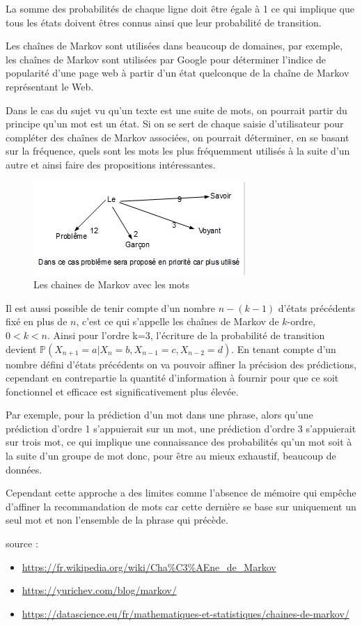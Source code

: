 \documentclass[final, 10pt]{report}
\begin{document}
La somme des probabilités de chaque ligne doit être égale à 1 ce qui implique que tous les états doivent êtres connus ainsi que leur probabilité de transition.

Les chaînes de Markov sont utilisées dans beaucoup de domaines, par exemple, les chaînes de Markov sont utilisées par Google pour déterminer l'indice de popularité d'une page web à partir d'un état quelconque de la chaîne de Markov représentant le Web.

Dans le cas du sujet vu qu'un texte est une suite de mots, on pourrait partir du principe qu'un mot est un état.
Si on se sert de chaque saisie d'utilisateur pour compléter des chaînes de Markov associées, on pourrait déterminer, en se basant sur la fréquence,  quels sont les mots les plus fréquemment utilisés à la suite d'un autre et ainsi faire des propositions intéressantes.
\begin{figure}[h]
    \centering
    \includegraphics[scale=1]{img/Mark.png}
    \caption{Les chaines de Markov avec les mots}
    \label{fig:chaine_markov_word}
\end{figure}

Il est aussi possible de tenir compte d'un nombre $n-(k-1)$ d'états précédents fixé en plus de $n$, c'est ce qui s'appelle les chaînes de Markov de $k$-ordre, $0<k<n$. Ainsi pour l'ordre k=3, l'écriture de la probabilité de transition devient $\mathbb{P}(X_{n+1}=a | X_{n}=b , X_{n-1}=c , X_{n-2}=d)$.
En tenant compte d'un nombre défini d'états précédents on va pouvoir affiner la précision des prédictions, cependant en contrepartie la quantité d'information à fournir pour que ce soit fonctionnel et efficace est significativement plus élevée.

Par exemple, pour la prédiction d'un mot dans une phrase, alors qu'une prédiction d'ordre 1 s'appuierait sur un mot, une prédiction d'ordre 3 s'appuierait sur trois mot, ce qui implique une connaissance des probabilités qu'un mot soit à la suite d'un groupe de mot donc, pour être au mieux exhaustif, beaucoup de données.

Cependant cette approche a des limites comme l'absence de mémoire qui empêche d'affiner la recommandation de mots car cette dernière se base sur uniquement un seul mot et non l'ensemble de la phrase qui précède.

\footnotesize
source : 
\begin{itemize}
    \item \url{https://fr.wikipedia.org/wiki/Cha\%C3\%AEne_de_Markov}
    \item \url{https://yurichev.com/blog/markov/}
    \item \url{https://datascience.eu/fr/mathematiques-et-statistiques/chaines-de-markov/}
\end{itemize}
\normalsize

\printbibliography[heading=bibintoc,title={Bibliographie}]
\end{document}
